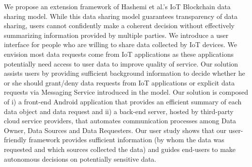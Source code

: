 We propose an extension framework of Hashemi et al.'s \cite{campbell} IoT Blockchain data sharing model. While this data sharing model guarantees transparency of data sharing, users cannot confidently make a coherent decision without effectively summarizing information provided by multiple parties. We introduce a user interface for people who are willing to share data collected by IoT devices. We envision most data requests come from IoT applications as these applications potentially need access to user data to improve quality of service. Our solution assists users by providing sufficient background information to decide whether he or she should grant/deny data requests from IoT applications or explicit data requests via Messaging Service introduced in the model. Our solution is composed of i) a front-end Android application that provides an efficient summary of each data object and data request and ii) a back-end server, hosted by third-party cloud service providers, that automates communication processes among Data Owner, Data Sources and Data Requesters. Our user study shows that our user-friendly framework provides sufficient information (by whom the data was requested and which sources collected the data) and guides end-users to make autonomous decisions on potentially sensitive data.